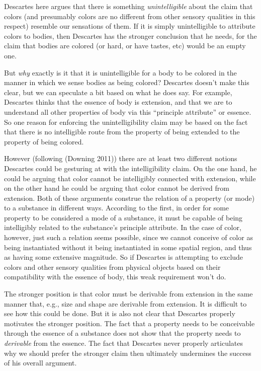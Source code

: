 \documentclass[12pt]{article}
\makeatletter
\newcommand{\citeprocitem}[2]{\hyper@linkstart{cite}{citeproc_bib_item_#1}#2\hyper@linkend}
\makeatother
\begin{document}
Descartes here argues that there is something \emph{unintelligible} about the
claim that colors (and presumably colors are no different from other
sensory qualities in this respect) resemble our sensations of them. If
it is simply unintelligible to attribute colors to bodies, then
Descartes has the stronger conclusion that he needs, for the claim that
bodies are colored (or hard, or have tastes, etc) would be an empty one.

But \emph{why} exactly is it that it is unintelligible for a body to be
colored in the manner in which we sense bodies as being colored?
Descartes doesn't make this clear, but we can speculate a bit based on
what he does say. For example, Descartes thinks that the essence of body
is extension, and that we are to understand all other properties of body
via this ``principle attribute'' or essence. So one reason for enforcing
the unintelligibility claim may be based on the fact that there is no
intelligible route from the property of being extended to the property
of being colored.

However (following (\citeprocitem{4}{Downing 2011})) there are at least two different
notions Descartes could be gesturing at with the intelligibility claim.
On the one hand, he could be arguing that color cannot be intelligibly
connected with extension, while on the other hand he could be arguing
that color cannot be derived from extension. Both of these arguments
construe the relation of a property (or mode) to a substance in
different ways. According to the first, in order for some property to be
considered a mode of a substance, it must be capable of being
intelligibly related to the substance's principle attribute. In the case
of color, however, just such a relation seems possible, since we cannot
conceive of color as being instantiated without it being instantiated in
some spatial region, and thus as having some extensive magnitude. So if
Descartes is attempting to exclude colors and other sensory qualities
from physical objects based on their compatibility with the essence of
body, this weak requirement won't do.

The stronger position is that color must be derivable from extension in
the same manner that, e.g., size and shape are derivable from extension.
It is difficult to see how this could be done. But it is also not clear
that Descartes properly motivates the stronger position. The fact that a
property needs to be conceivable through the essence of a substance does
not show that the property needs to \emph{derivable} from the essence. The
fact that Descartes never properly articulates why we should prefer the
stronger claim then ultimately undermines the success of his overall
argument.
\end{document}
